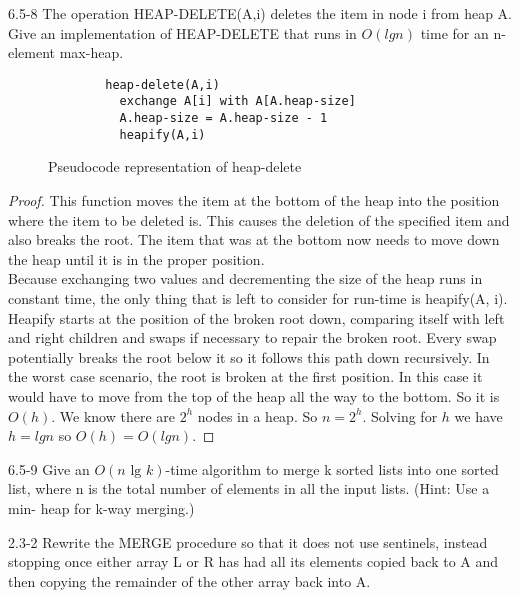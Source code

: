 \begin{problem}{6.5-8}
  The operation HEAP-DELETE(A,i) deletes the item in node i from heap A. Give an implementation of HEAP-DELETE that runs
  in $O(lgn)$ time for an n-element max-heap.
  \begin{solution}
    \begin{figure}[here]
      \caption{Pseudocode representation of heap-delete}
      \centering
      \begin{lstlisting}
        heap-delete(A,i)
          exchange A[i] with A[A.heap-size]
          A.heap-size = A.heap-size - 1
          heapify(A,i)
      \end{lstlisting}
    \end{figure}
    \begin{proof}
      This function moves the item at the bottom of the heap into the position where the item to be deleted is.
      This causes the deletion of the specified item and also breaks the root. The item that was at the bottom now needs
      to move down the heap until it is in the proper position. \\

      Because exchanging two values and decrementing the size of the heap runs in constant time, the only thing that is
      left to consider for run-time is heapify(A, i). \\

      Heapify starts at the position of the broken root down, comparing itself with left and right children
      and swaps if necessary to repair the broken root. Every swap potentially breaks the root below it so it follows this
      path down recursively. In the worst case scenario, the root is broken at the first position. In this case it would
      have to move from the top of the heap all the way to the bottom. So it is $O(h)$. We know there are $2^h$ nodes in a
      heap. So $n = 2^h$. Solving for $h$ we have $ h = lg n$ so $O(h) = O(lg n)$.
    \end{proof}
  \end{solution}
\end{problem}

\begin{problem}{6.5-9}
  Give an $O(n \text{ lg }k)$-time algorithm to merge k sorted lists into one sorted list, where n is the total number of elements in
  all the input lists. (Hint: Use a min- heap for k-way merging.)
\end{problem}

\begin{problem}{2.3-2}
  Rewrite the MERGE procedure so that it does not use sentinels, instead stopping once either array L or R has had all its
  elements copied back to A and then copying the remainder of the other array back into A.
\end{problem}


